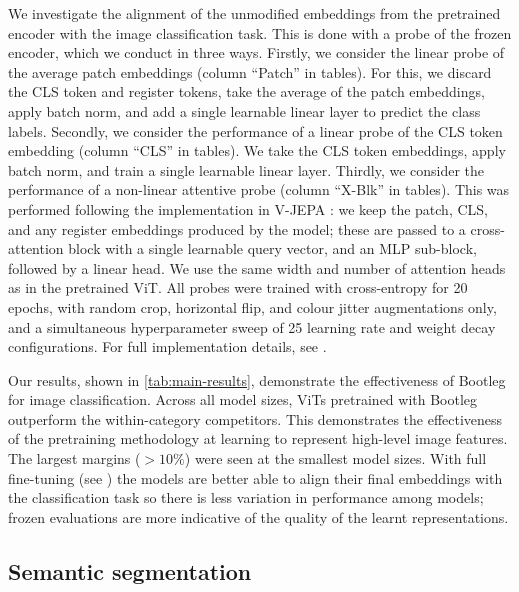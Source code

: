 \label{s:in1k-probe}
We investigate the alignment of the unmodified embeddings from the pretrained encoder with the image classification task.
This is done with a probe of the frozen encoder, which we conduct in three ways.
Firstly, we consider the linear probe of the average patch embeddings (column ``Patch'' in tables).
For this, we discard the CLS token and register tokens, take the average of the patch embeddings, apply batch norm, and add a single learnable linear layer to predict the class labels.
Secondly, we consider the performance of a linear probe of the CLS token embedding (column ``CLS'' in tables).
We take the CLS token embeddings, apply batch norm, and train a single learnable linear layer.
Thirdly, we consider the performance of a non-linear attentive probe (column ``X-Blk'' in tables).
This was performed following the implementation in V-JEPA \citep{bardes2024vjepa, assran2025vjepa2}: we keep the patch, CLS, and any register embeddings produced by the model; these are passed to a cross-attention block with a single learnable query vector, and an MLP sub-block, followed by a linear head.
We use the same width and number of attention heads as in the pretrained ViT.
All probes were trained with cross-entropy for 20 epochs, with random crop, horizontal flip, and colour jitter augmentations only, and a simultaneous hyperparameter sweep of 25 learning rate and weight decay configurations. %
For full implementation details, see \iftoggle{arxiv}{\cref{a:eval-method-classification-probe}}{the supplementary materials}.

%

Our results, shown in \cref{tab:main-results}, demonstrate the effectiveness of Bootleg for image classification.
Across all model sizes, ViTs pretrained with Bootleg outperform the within-category competitors. %
This demonstrates the effectiveness of the pretraining methodology at learning to represent high-level image features.
The largest margins ($>\!10\%$) were seen at the smallest model sizes.
With full fine-tuning (see \iftoggle{arxiv}{\cref{s:results-ft}}{supplement}) the models are better able to align their final embeddings with the classification task so there is less variation in performance among models; frozen evaluations are more indicative of the quality of the learnt representations.



\subsection{Semantic segmentation}

